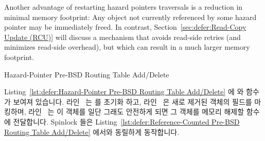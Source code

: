 Another advantage of restarting hazard pointers traversals is a reduction in
minimal memory footprint:
Any object not currently referenced by some hazard pointer may be
immediately freed.
In contrast,
Section~\ref{sec:defer:Read-Copy Update (RCU)}
will discuss a mechanism that avoids read-side retries (and minimizes
read-side overhead), but which can result in a much larger memory
footprint.

\fi

\begin{listing}[tbp]

\caption{Hazard-Pointer Pre-BSD Routing Table Add\slash Delete}
\label{lst:defer:Hazard-Pointer Pre-BSD Routing Table Add/Delete}
\end{listing}

\begin{fcvref}
Listing~\ref{lst:defer:Hazard-Pointer Pre-BSD Routing Table Add/Delete}
에  와  함수가 보여져 있습니다.
라인~ 는  를 초기화 하고, 라인~
은 새로 제거된 객체의  필드를 마킹하며, 라인~
는 이 객체를 일단 그래도 안전하게 되면 그 객체를 메모리 해제할
 함수에 전달합니다.
Spinlock 들은
Listing~\ref{lst:defer:Reference-Counted Pre-BSD Routing Table Add/Delete}
에서와 동릴하게 동작합니다.
\end{fcvref}

